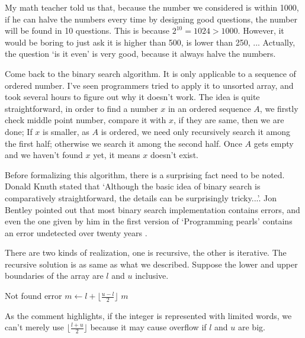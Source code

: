 \documentclass[UTF8]{article}
\begin{document}
My math teacher told us that, because the number we considered is within 1000, if he can halve the
numbers every time by designing good questions, the number will be found in 10 questions. This is because
$2^{10} = 1024 > 1000$. However, it would be boring to just ask it is higher than 500, is lower
than 250, ... Actually, the question `is it even' is very good, because it always
halve the numbers.

Come back to the binary search algorithm. It is only applicable to a sequence of ordered number.
I've seen programmers tried to apply it to unsorted array, and took several hours to figure out
why it doesn't work. The idea is quite straightforward, in order to find a number $x$ in an
ordered sequence $A$, we firstly check middle point number, compare it with $x$, if
they are same, then we are done; If $x$ is smaller, as $A$ is ordered, we need only
recursively search it among the first half; otherwise we search it among the second half.
Once $A$ gets empty and we haven't found $x$ yet, it means $x$ doesn't exist.

Before formalizing this algorithm, there is a surprising fact need to be noted. Donald Knuth stated that
`Although the basic idea of binary search is comparatively straightforward,
the details can be surprisingly tricky...'. Jon Bentley pointed out that most binary search implementation
contains errors, and even the one given by him in the first version of `Programming pearls' contains
an error undetected over twenty years \cite{programming-pearls}.

There are two kinds of realization, one is recursive, the other is iterative. The recursive solution
is as same as what we described. Suppose the lower and upper boundaries of the array
are $l$ and $u$ inclusive.

\begin{algorithmic}[1]
    \State Not found error
  \Else
     \State $m \gets l + \lfloor \frac{u - l}{2} \rfloor$ 
       \State \Return $m$
     \EndIf
       \State \Return {}
     \Else
       \State \Return {}
     \EndIf
  \EndIf
\EndFunction
\end{algorithmic}

As the comment highlights, if the integer is represented with limited words, we can't merely use $\lfloor \frac{l+u}{2} \rfloor$
because it may cause overflow if $l$ and $u$ are big.
\end{document}
